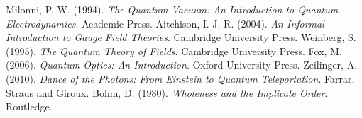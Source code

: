 \documentclass[a4paper,12pt]{article}
\theoremstyle{definition}
\theoremstyle{remark}
\begin{document}
\begin{thebibliography}{99}
		 Milonni, P. W. (1994). \textit{The Quantum Vacuum: An Introduction to Quantum Electrodynamics}. Academic Press.
		 Aitchison, I. J. R. (2004). \textit{An Informal Introduction to Gauge Field Theories}. Cambridge University Press.
		 Weinberg, S. (1995). \textit{The Quantum Theory of Fields}. Cambridge University Press.
		 Fox, M. (2006). \textit{Quantum Optics: An Introduction}. Oxford University Press.
		 Zeilinger, A. (2010). \textit{Dance of the Photons: From Einstein to Quantum Teleportation}. Farrar, Straus and Giroux.
		 Bohm, D. (1980). \textit{Wholeness and the Implicate Order}. Routledge.
	\end{thebibliography}
	
\end{document}
